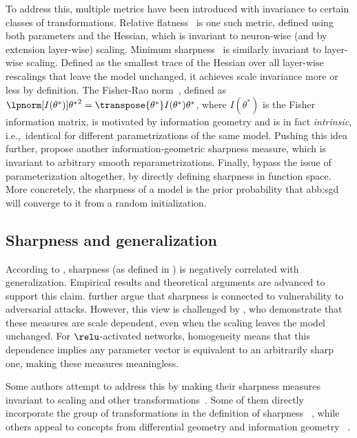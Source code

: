 To address this, multiple metrics have been introduced
with invariance to certain classes of transformations.
Relative flatness~\cite{petzkaRelativeFlatnessGeneralization2021}
is one such metric, defined using both parameters and the Hessian,
which is invariant to neuron-wise (and by extension layer-wise) scaling.
Minimum sharpness~\cite{ibayashiMinimumSharpnessScaleinvariant2021}
is similarly invariant to layer-wise scaling.
Defined as the smallest trace of the Hessian over all layer-wise rescalings
that leave the model unchanged, it achieves scale invariance more or less by definition.
The Fisher-Rao norm~\cite{liangFisherRaoMetricGeometry2019},
defined as
\(
\lpnorm[I(\theta^{\ast})]{\theta^{\ast}}^{2} =
\transpose{{\theta^{\ast}}}I(\theta^{\ast})\theta^{\ast}
\),
where \(I(\theta^{\ast})\) is the Fisher information matrix,
is motivated by information geometry and is in fact \emph{intrinsic},
i.e.,\ identical for different parametrizations of the same model.
Pushing this idea further, \citet{jangReparametrizationInvariantSharpnessMeasure2022}
propose another information-geometric sharpness measure,
which is invariant to arbitrary smooth reparametrizations.
Finally, \citet{zhangWhyFlatnessDoes2021} bypass the issue of parameterization altogether,
by directly defining sharpness in function space.
More concretely, the sharpness of a model is the prior probability that
\gls{abb:sgd} will converge to it from a random initialization.

\subsection{Sharpness and generalization}\label{sub:sharpness:generalization}

According to \citet{keskarLargeBatchTrainingDeep2022,hochreiterFlatMinima1997},
sharpness (as defined in )
is negatively correlated with generalization.
Empirical results and theoretical arguments are advanced to support this claim.
\citet{sunExploringVulnerabilityDeep2021} further argue that sharpness is connected
to vulnerability to adversarial attacks.
However, this view is challenged by \citet{dinhSharpMinimaCan2017},
who demonstrate that these measures are scale dependent,
even when the scaling leaves the model unchanged.
For \(\relu\)-activated networks, homogeneity means that this dependence implies
any parameter vector is equivalent to an arbitrarily sharp one, making these measures meaningless.

Some authors attempt to address this by making their sharpness measures invariant to scaling
and other transformations~\cite{%
	ibayashiMinimumSharpnessScaleinvariant2021,%
	petzkaRelativeFlatnessGeneralization2021,%
	liangFisherRaoMetricGeometry2019,%
	jangReparametrizationInvariantSharpnessMeasure2022%
}.
Some of them directly incorporate the group of transformations in the definition of sharpness%
~\cite{%
	ibayashiMinimumSharpnessScaleinvariant2021,%
	kwonASAMAdaptiveSharpnessAware2021%
},
while others appeal to concepts from differential geometry and information geometry%
~\cite{%
	liangFisherRaoMetricGeometry2019,%
	jangReparametrizationInvariantSharpnessMeasure2022%
}.

